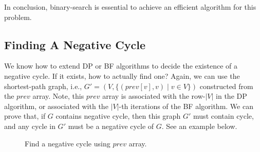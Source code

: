 In conclusion, binary-search is essential to achieve an efficient algorithm for this problem.

\subsection*{Finding A Negative Cycle}

We know how to extend DP or BF algorithms to decide the existence of a negative cycle.
If it exists, how to actually find one?
Again, we can use the shortest-path graph, i.e., $G' = (V, \{(prev[v], v) \mid v\in V\})$ constructed
from the $prev$ array. Note, this $prev$ array is associated with the row-$|V|$ in the DP algorithm,
or associated with the $|V|$-th iterations of the BF algorithm.
We can prove that, if $G$ contains negative cycle, then this graph $G'$ must contain cycle,
and any cycle in $G'$ must be a negative cycle of $G$. See an example below.

\begin{figure}[h]
\centering{}
\caption{Find a negative cycle using $prev$ array.}
\label{fig:dpbf}
\end{figure}


